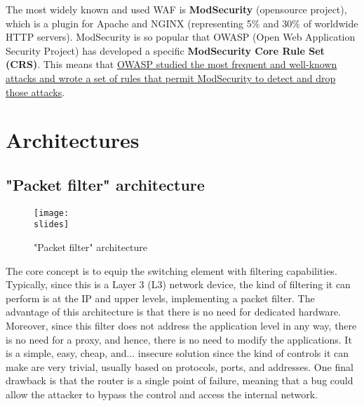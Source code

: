 The most widely known and used WAF is \textbf{ModSecurity} (opensource project), which is a plugin for Apache and NGINX (representing 5\% and 30\% of worldwide HTTP servers). ModSecurity is so popular that OWASP (Open Web Application Security Project) has developed a specific \textbf{ModSecurity Core Rule Set} \textbf{(CRS)}. This means that \ul{OWASP studied the most frequent and well-known attacks and wrote a set of rules that permit ModSecurity to detect and drop those attacks}.


\section{Architectures}

\subsection{"Packet filter" architecture}

\begin{figure}[h]
    \centering
    \texttt{[image: \\slides]}
    \caption{"Packet filter" architecture}
\end{figure}
The core concept is to equip the switching element with filtering capabilities. Typically, since this is a Layer 3 (L3) network device, the kind of filtering it can perform is at the IP and upper levels, implementing a packet filter. The advantage of this architecture is that there is no need for dedicated hardware. Moreover, since this filter does not address the application level in any way, there is no need for a proxy, and hence, there is no need to modify the applications. It is a simple, easy, cheap, and... insecure solution since the kind of controls it can make are very trivial, usually based on protocols, ports, and addresses. One final drawback is that the router is a single point of failure, meaning that a bug could allow the attacker to bypass the control and access the internal network.
